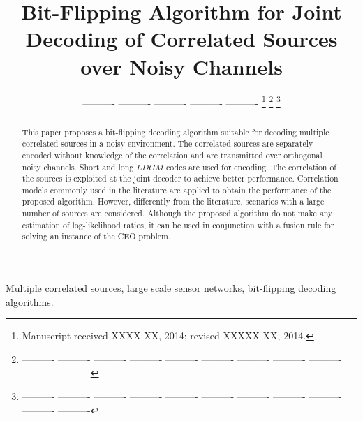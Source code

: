 \documentclass[journal]{IEEEtran}
\begin{document}
\title{Bit-Flipping Algorithm for Joint Decoding of Correlated Sources over Noisy Channels}


\author{---------- ---------- ---------- ---------- ---------- %
\thanks{Manuscript received XXXX XX, 2014; revised XXXXX XX, 2014.}
\thanks{---------- ---------- ---------- ---------- ---------- ---------- ---------- ---------- ---------- ---------- ---------- }%
\thanks{---------- ---------- ---------- ---------- ---------- ---------- ---------- ---------- ---------- ---------- ---------- }}%


\maketitle


\begin{abstract}
This paper proposes a bit-flipping decoding algorithm suitable for decoding
multiple correlated sources in a noisy environment.   The correlated sources are
separately encoded without knowledge of the correlation and are transmitted
over orthogonal noisy channels. Short and long $LDGM$ codes are used for encoding. The
correlation of the sources is exploited at the joint decoder to achieve better
performance. Correlation models commonly
used in the literature are applied to obtain the performance of the proposed
algorithm. However, differently from the literature, scenarios with a large
number of sources are considered. Although the proposed algorithm do not make any estimation of
log-likelihood ratios, it can be used in conjunction with a fusion rule for
solving an instance of the CEO problem.
\end{abstract}

\begin{keywords}
Multiple correlated sources, large scale sensor networks, bit-flipping decoding algorithms.
\end{keywords}

\IEEEpeerreviewmaketitle
\end{document}
